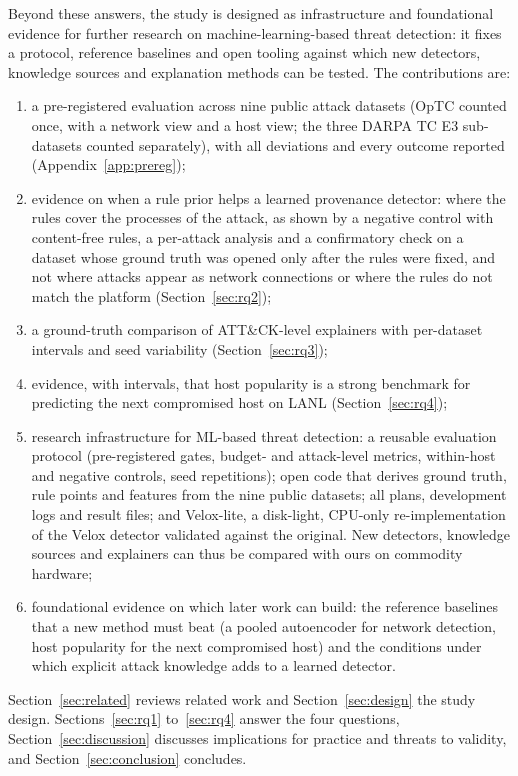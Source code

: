 \documentclass[acmlarge,screen,review]{acmart}
\begin{document}
Beyond these answers, the study is designed as infrastructure and foundational evidence for further research on
machine-learning-based threat detection: it fixes a protocol, reference baselines and open tooling against which new
detectors, knowledge sources and explanation methods can be tested. The contributions are:
\begin{enumerate}
\item a pre-registered evaluation across nine public attack datasets (OpTC counted once, with a network view and a host
view; the three DARPA TC E3 sub-datasets counted separately), with all deviations and every outcome reported
(Appendix~\ref{app:prereg});
\item evidence on when a rule prior helps a learned provenance detector: where the rules cover the processes of
the attack, as shown by a negative control with content-free rules, a per-attack analysis and a confirmatory check on
a dataset whose ground truth was opened only after the rules were fixed, and not where attacks
appear as network connections or where the rules do not match the platform (Section~\ref{sec:rq2});
\item a ground-truth comparison of ATT\&CK-level explainers with per-dataset intervals and seed variability
(Section~\ref{sec:rq3});
\item evidence, with intervals, that host popularity is a strong benchmark for predicting the next compromised host
on LANL (Section~\ref{sec:rq4});
\item research infrastructure for ML-based threat detection: a reusable evaluation protocol (pre-registered
gates, budget- and attack-level metrics, within-host and negative controls, seed repetitions); open code that derives
ground truth, rule points and features from the nine public datasets; all plans, development logs and result files;
and Velox-lite, a disk-light, CPU-only re-implementation of the Velox detector validated against the original. New
detectors, knowledge sources and explainers can thus be compared with ours on commodity hardware;
\item foundational evidence on which later work can build: the reference baselines that a new method must
beat (a pooled autoencoder for network detection, host popularity for the next compromised host) and the conditions
under which explicit attack knowledge adds to a learned detector.
\end{enumerate}
Section~\ref{sec:related} reviews related work and Section~\ref{sec:design} the study design. Sections~\ref{sec:rq1}
to~\ref{sec:rq4} answer the four questions, Section~\ref{sec:discussion} discusses implications for practice and
threats to validity, and Section~\ref{sec:conclusion} concludes.
\end{document}
